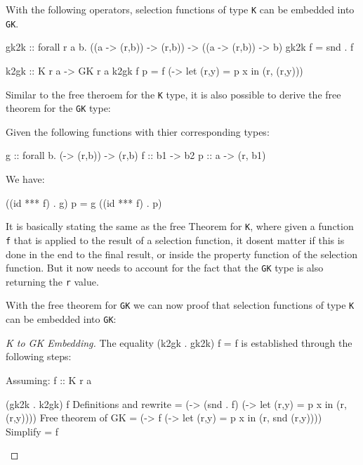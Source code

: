 \documentclass[runningheads]{llncs}
\begin{document}
With the following operators, selection functions of type \texttt{K} can
be embedded into \texttt{GK}.

\begin{code}
gk2k :: forall r a b. ((a -> (r,b)) -> (r,b)) -> ((a -> (r,b)) -> b)
gk2k f = snd . f
\end{code}

\begin{code}
k2gk :: K r a -> GK r a
k2gk f p = f (\x -> let (r,y) = p x in (r, (r,y)))
\end{code}

Similar to the free theroem for the \texttt{K} type, it is also possible
to derive the free theorem for the \texttt{GK} type:

\begin{theorem}
Given the following functions with thier corresponding types:

\begin{haskell}
g :: forall b. (\a -> (r,b)) -> (r,b)
f :: b1 -> b2
p :: a -> (r, b1)
\end{haskell}

We have:

\begin{haskell}
((id *** f) . g) p = g ((id *** f) . p)
\end{haskell}

\end{theorem}

It is basically stating the same as the free Theorem for \texttt{K},
where given a function \texttt{f} that is applied to the result of a
selection function, it dosent matter if this is done in the end to the
final result, or inside the property function of the selection function.
But it now needs to account for the fact that the \texttt{GK} type is
also returning the \texttt{r} value.

With the free theorem for \texttt{GK} we can now proof that selection
functions of type \texttt{K} can be embedded into \texttt{GK}:

\begin{proof}[K to GK Embedding]
The equality (k2gk . gk2k) f = f is established through the following steps:

Assuming: f :: K r a

\begin{haskell}
(gk2k . k2gk) f
{{ Definitions and rewrite }}
= (\p -> (snd . f) (\x -> let (r,y) = p x in (r, (r,y)))) 
{{ Free theorem of GK }}
= (\p -> f (\x -> let (r,y) = p x in (r, snd (r,y))))
{{ Simplify }}
= f
\end{haskell}
\end{proof}
\end{document}
